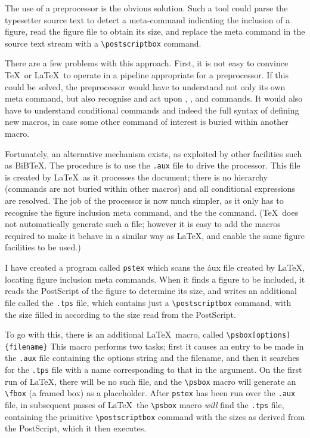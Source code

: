 The use of a preprocessor is the obvious solution.
Such a tool could parse the typesetter source text
to detect a meta-command indicating the inclusion of a figure,
read the figure file to obtain its size,
and replace the meta command in the source text stream
with a
\verb|\postscriptbox| command.

There are a few problems with this approach.
First, it is not easy to convince \TeX\ or \LaTeX\ to
operate in a pipeline appropriate for a preprocessor.
If this could be solved, the preprocessor would
have to understand not only its own meta command,
but also recognise and act upon
\verb||, \verb||, and \verb||
commands.
It would also have to understand conditional commands
and indeed the full syntax of defining new macros,
in case some other command of interest is buried within another macro.

Fortunately, an alternative mechanism exists,
as exploited by other facilities such as
BiB\TeX.
The procedure is to use the {\tt .aux} file to drive the
processor.
This file is created by \LaTeX\ as it processes the document;
there is no hierarchy (commands are not buried within other macros)
and all conditional expressions are resolved.
The job of the processor is now much simpler,
as it only has to recognise the figure inclusion meta command,
and the the \verb|| command.
(\TeX\ does not automatically generate such a file;
however it is easy to add the macros required to make
it behave in a similar way as \LaTeX,
and enable the same figure facilities to be used.)

I have created a program called {\tt pstex}
which scans the {\.aux} file created by \LaTeX,
locating figure inclusion meta commands.
When it finds a figure to be included,
it reads the PostScript of the figure
to determine its size,
and writes an additional file
called the {\tt .tps} file,
which contains just a \verb|\postscriptbox| command,
with the size filled in according to the size read from the PostScript.

To go with this, there is an additional \LaTeX\ macro,
called \verb|\psbox[options]{filename}|
This macro performs two tasks;
first it causes an entry to be made in the
{\tt .aux} file containing the options string and the filename,
and then it searches for the {\tt .tps} file with a name corresponding
to that in the argument.
On the first run of \LaTeX, there will be no such file,
and the \verb|\psbox| macro will generate an \verb|\fbox|
(a framed box) as a placeholder.
After {\tt pstex} has been run over the {\tt .aux} file,
in subsequent passes of \LaTeX\ the \verb|\psbox|
macro {\em will} find the {\tt .tps} file,
containing the primitive \verb|\postscriptbox|
command with the sizes as derived from the PostScript,
which it then executes.

